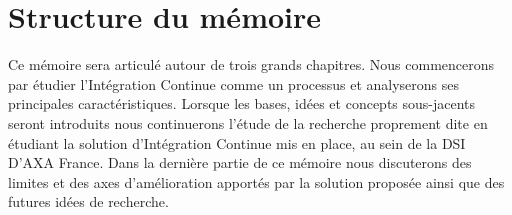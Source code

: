 \documentclass{report}
\begin{document}
    \section{Structure du mémoire}
    Ce mémoire sera articulé autour de trois grands chapitres. Nous commencerons par étudier l'Intégration Continue comme un processus et analyserons ses principales caractéristiques. Lorsque les bases, idées et concepts sous-jacents seront introduits nous continuerons l'étude de la recherche proprement dite en étudiant la solution d'Intégration Continue mis en place, au sein de la DSI D'AXA France. Dans la dernière partie de ce mémoire nous discuterons des limites et des axes d'amélioration apportés par la solution proposée ainsi que des futures idées de recherche.


  

  

  

  \listoffigures                  %
  \appendix
  \label{CloudComputing}
\end{document}
